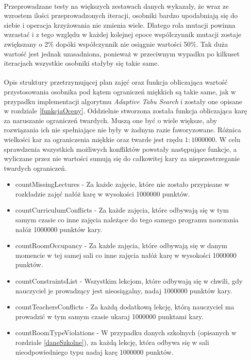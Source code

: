 \paragraph{}Przeprowadzane testy na większych zestawach danych wykazały, że wraz ze wzrostem ilości przeprowadzonych iteracji, osobniki bardzo upodabniają się do siebie i operacja krzyżowania nie zmienia wiele. Dlatego rola mutacji powinna wzrastać i z tego względu w każdej kolejnej epoce współczynnik mutacji zostaje zwiększany o 2\% dopóki współczynnik nie osiągnie wartości 50\%. Tak duża wartość jest jednak uzasadniona, ponieważ w przeciwnym wypadku po kilkuset iteracjach wszystkie osobniki stałyby się takie same.
\paragraph{}Opis struktury przetrzymującej plan zajęć oraz funkcja obliczająca wartość przystosowania osobnika pod kątem ograniczeń miękkich są takie same, jak w przypadku implementacji algorytmu \emph{Adaptive Tabu Search} i zostały one opisane w rozdziale \ref{funkcjaOceny}. Oddzielnie stworzona została funkcja obliczająca karę za naruszanie ograniczeń twardych. Muszą one być o wiele większe, aby rozwiązania ich nie spełniające nie były w żadnym razie faworyzowane\cite{ga2003}. Różnica wielkości kar za ograniczenia miękkie oraz twarde jest rzędu $1:1000000$. W celu sprawdzenia wszystkich możliwych konfliktów powstały następujące funkcje, a wyliczane przez nie wartości sumują się do całkowitej kary za nieprzestrzeganie twardych ograniczeń.
\begin{itemize}
\item{countMissingLectures} - Za każde zajęcie, które nie zostało przypisane w rozkładzie zajęć nałóż karę w wysokości 1000000 punktów.
\item{countCurriculumConflicts} - Za każde zajęcia, które odbywają się w tym samym czasie co inne zajęcia należące do tego samego programu nauczania nałóż 1000000 punktów kary.
\item{countRoomOccupancy} - Za każde zajęcia, które odbywają się w danym momencie w tej samej sali co inne zajęcia nałóż karę w wysokości 1000000 punktów.
\item{countConstraintsList} - Wszystkim lekcjom, które odbywają się w chwili, gdy nauczyciel je prowadzący jest nieosiągalny, nadaj 1000000 punktów kary.
\item{countTeachersConflicts} - Za każdą dodatkową lekcję, którą nauczyciel ma prowadzić w tym samym czasie ukaraj 1000000 punktami kary.
\item{countRoomTypeViolations} - W przypadku danych szkolnych (opisanych w rozdziale \ref{daneSzkolne}), za każdą lekcję, która odbywa się w sali nieodpowiedniego typu nadaj karę 1000000 punktów.
\end{itemize}